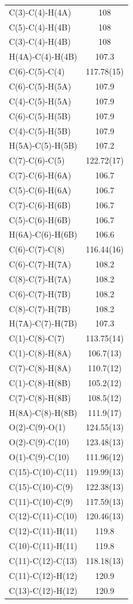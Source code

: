 \begin{center}
{\begin{supertabular}{p{1.5in}c}
C(3)-C(4)-H(4A)&108\\
C(5)-C(4)-H(4B)&108\\
C(3)-C(4)-H(4B)&108\\
H(4A)-C(4)-H(4B)&107.3\\
C(6)-C(5)-C(4)&117.78(15)\\
C(6)-C(5)-H(5A)&107.9\\
C(4)-C(5)-H(5A)&107.9\\
C(6)-C(5)-H(5B)&107.9\\
C(4)-C(5)-H(5B)&107.9\\
H(5A)-C(5)-H(5B)&107.2\\
C(7)-C(6)-C(5)&122.72(17)\\
C(7)-C(6)-H(6A)&106.7\\
C(5)-C(6)-H(6A)&106.7\\
C(7)-C(6)-H(6B)&106.7\\
C(5)-C(6)-H(6B)&106.7\\
H(6A)-C(6)-H(6B)&106.6\\
C(6)-C(7)-C(8)&116.44(16)\\
C(6)-C(7)-H(7A)&108.2\\
C(8)-C(7)-H(7A)&108.2\\
C(6)-C(7)-H(7B)&108.2\\
C(8)-C(7)-H(7B)&108.2\\
H(7A)-C(7)-H(7B)&107.3\\
C(1)-C(8)-C(7)&113.75(14)\\
C(1)-C(8)-H(8A)&106.7(13)\\
C(7)-C(8)-H(8A)&110.7(12)\\
C(1)-C(8)-H(8B)&105.2(12)\\
C(7)-C(8)-H(8B)&108.5(12)\\
H(8A)-C(8)-H(8B)&111.9(17)\\
O(2)-C(9)-O(1)&124.55(13)\\
O(2)-C(9)-C(10)&123.48(13)\\
O(1)-C(9)-C(10)&111.96(12)\\
C(15)-C(10)-C(11)&119.99(13)\\
C(15)-C(10)-C(9)&122.38(13)\\
C(11)-C(10)-C(9)&117.59(13)\\
C(12)-C(11)-C(10)&120.46(13)\\
C(12)-C(11)-H(11)&119.8\\
C(10)-C(11)-H(11)&119.8\\
C(11)-C(12)-C(13)&118.18(13)\\
C(11)-C(12)-H(12)&120.9\\
C(13)-C(12)-H(12)&120.9\\

\end{supertabular}}
\end{center}
